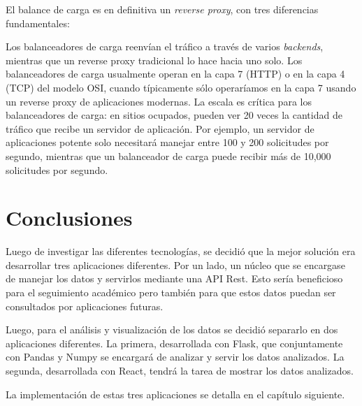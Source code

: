 El balance de carga es en definitiva un \textit{reverse proxy}, con tres diferencias fundamentales: 
\begin{outline}
\1 Los balanceadores de carga reenvían el tráfico a través de varios \textit{backends}, mientras que un reverse proxy tradicional lo hace hacia uno solo.
\1 Los balanceadores de carga usualmente operan en la capa 7 (HTTP) o en la capa 4 (TCP) del modelo OSI, cuando típicamente sólo operaríamos en la capa 7 usando un reverse proxy de aplicaciones modernas.
\1 La escala es crítica para los balanceadores de carga: en sitios ocupados, pueden ver 20 veces la cantidad de tráfico que recibe un servidor de aplicación. Por ejemplo, un servidor de aplicaciones potente solo necesitará manejar entre 100 y 200 solicitudes por segundo, mientras que un balanceador de carga puede recibir más de 10,000 solicitudes por segundo.
\end{outline}


\section[Conclusiones]{Conclusiones}

Luego de investigar las diferentes tecnologías, se decidió que la mejor solución era desarrollar tres aplicaciones diferentes. Por un lado, un núcleo que se encargase de manejar los datos y servirlos mediante una API Rest. Esto sería beneficioso para el seguimiento académico pero también para que estos datos puedan ser consultados por aplicaciones futuras. 

Luego, para el análisis y visualización de los datos se decidió separarlo en dos aplicaciones diferentes. La primera, desarrollada con Flask, que conjuntamente con Pandas y Numpy se encargará de analizar y servir los datos analizados. La segunda, desarrollada con React, tendrá la tarea de mostrar los datos analizados.

La implementación de estas tres aplicaciones se detalla en el capítulo siguiente.